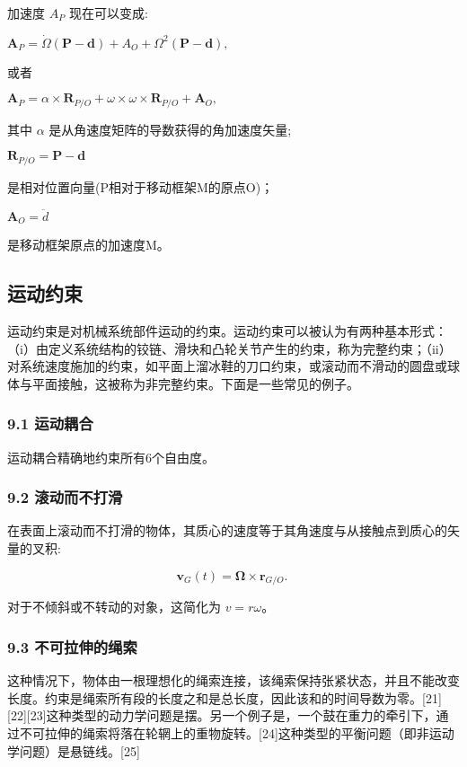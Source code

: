 加速度 $A_P$ 现在可以变成:

$\mathbf{A}_P = \dot{\Omega} (\mathbf{P - d}) + A_O + \Omega^2 (\mathbf{P - d}),$

或者

$\mathbf{A}_P = \alpha \times \mathbf{R}_{P/O} + \omega \times \omega \times \mathbf{R}_{P/O} + \mathbf{A}_O,$

其中 $\alpha$ 是从角速度矩阵的导数获得的角加速度矢量;

$\mathbf{R}_{P/O}=\mathbf{P}-\mathbf{d}$

是相对位置向量(P相对于移动框架M的原点O)；

$\mathbf{A}_{O}=\ddot{d}$

是移动框架原点的加速度M。

\subsection{运动约束}

运动约束是对机械系统部件运动的约束。运动约束可以被认为有两种基本形式：（i）由定义系统结构的铰链、滑块和凸轮关节产生的约束，称为完整约束；（ii）对系统速度施加的约束，如平面上溜冰鞋的刀口约束，或滚动而不滑动的圆盘或球体与平面接触，这被称为非完整约束。下面是一些常见的例子。

\subsubsection{9.1 运动耦合}

运动耦合精确地约束所有6个自由度。

\subsubsection{9.2 滚动而不打滑}

在表面上滚动而不打滑的物体，其质心的速度等于其角速度与从接触点到质心的矢量的叉积:

\begin{equation}
\mathbf{v}_G(t) = \mathbf{\Omega} \times \mathbf{r}_{G/O}.~
\end{equation}

对于不倾斜或不转动的对象，这简化为 $v = r\omega$。

\subsubsection{9.3 不可拉伸的绳索}

这种情况下，物体由一根理想化的绳索连接，该绳索保持张紧状态，并且不能改变长度。约束是绳索所有段的长度之和是总长度，因此该和的时间导数为零。[21][22][23]这种类型的动力学问题是摆。另一个例子是，一个鼓在重力的牵引下，通过不可拉伸的绳索将落在轮辋上的重物旋转。[24]这种类型的平衡问题（即非运动学问题）是悬链线。[25]


